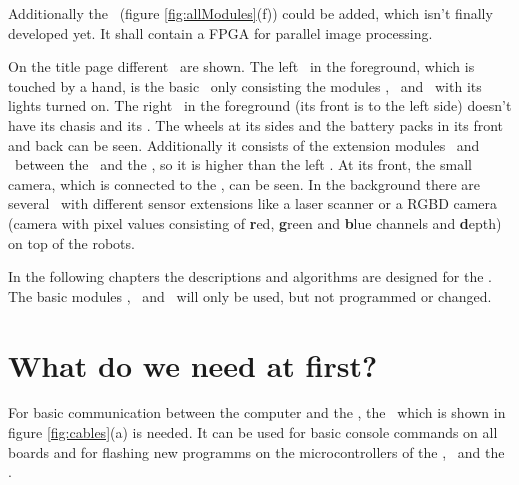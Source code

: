 Additionally the \imageproc\ (figure \ref{fig:allModules}(f)) could be added, which isn't finally developed yet. It shall contain a FPGA for parallel image processing.

On the title page different \amiros\ are shown. The left \amiro\ in the foreground, which is touched by a hand, is the basic \amiro\ only consisting the modules \diwheel, \power\ and \light\ with its lights turned on. The right \amiro\ in the foreground (its front is to the left side) doesn't have its chasis and its \proxring. The wheels at its sides and the battery packs in its front and back can be seen. Additionally it consists of the extension modules \cognition\ and \imageproc\ between the \power\ and the \light, so it is higher than the left \amiro. At its front, the small camera, which is connected to the \cognition, can be seen. In the background there are several \amiros\ with different sensor extensions like a laser scanner or a RGBD camera (camera with pixel values consisting of {\bf r}ed, {\bf g}reen and {\bf b}lue channels and {\bf d}epth) on top of the robots.


In the following chapters the descriptions and algorithms are designed for the \cognition. The basic modules \diwheel, \power\ and \light\ will only be used, but not programmed or changed.

\chapter{What do we need at first?}

For basic communication between the computer and the \amiro, the \progcable\ which is shown in figure \ref{fig:cables}(a) is needed. It can be used for basic console commands on all boards and for flashing new programms on the microcontrollers of the \diwheel, \power\ and the \light.

